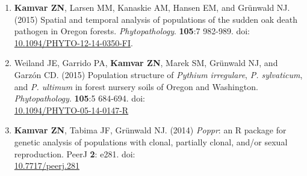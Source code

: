 \documentclass[12pt,letterpaper]{article}
\begin{document}
\begin{enumerate}[leftmargin = 14pt]
	\vspace{6pt}

	\item \textbf{Kamvar ZN}, Larsen MM, Kanaskie AM, Hansen EM, and Gr\"unwald
	NJ. (2015) Spatial and temporal analysis of populations of the sudden oak
	death pathogen in Oregon forests. \textit{Phytopathology}. \textbf{105}:7
	982-989. doi: 
	\href{http://dx.doi.org/10.1094/PHYTO-12-14-0350-FI}{10.1094/PHYTO-12-14-0350-FI}.
	
	\vspace{6pt}

	\item Weiland JE, Garrido PA, \textbf{Kamvar ZN}, Marek SM, Gr\"unwald NJ, and
	Garz\'on CD. (2015) Population structure of \textit{Pythium irregulare}, \textit{P.
	sylvaticum}, and \textit{P. ultimum} in forest nursery soils of Oregon and
	Washington. \textit{Phytopathology}. \textbf{105}:5 684-694. doi: \\
	\href{http://dx.doi.org/10.1094/PHYTO-05-14-0147-R}{10.1094/PHYTO-05-14-0147-R}
	
	\vspace{6pt}

    \item \textbf{Kamvar ZN}, Tabima JF, Gr\"unwald NJ. (2014) \textit{Poppr}: an
	R package for genetic analysis of populations with clonal, partially clonal,
	and/or sexual reproduction. PeerJ \textbf{2}: e281. doi: \\
	\href{http://dx.doi.org/10.7717/peerj.281}{10.7717/peerj.281}

\end{enumerate}
\end{document}
